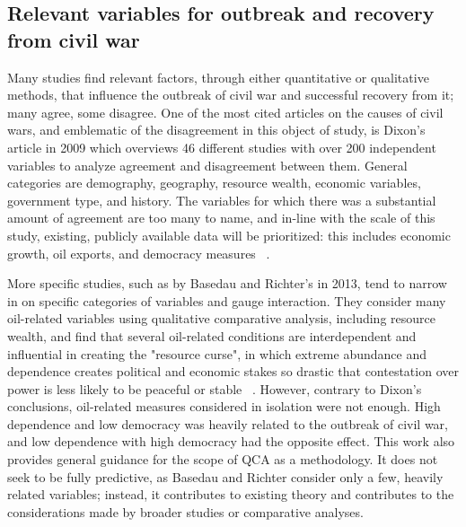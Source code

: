 \documentclass{article}
\begin{document}
\subsection{Relevant variables for outbreak and recovery from civil war}
Many studies find relevant factors, through either quantitative or qualitative methods, that influence the outbreak of civil war and successful recovery from it; many agree, some disagree. One of the most cited articles on the causes of civil wars, and emblematic of the disagreement in this object of study, is Dixon's article in 2009 which overviews 46 different studies with over 200 independent variables to analyze agreement and disagreement between them. General categories are demography, geography, resource wealth, economic variables, government type, and history. The variables for which there was a substantial amount of agreement are too many to name, and in-line with the scale of this study, existing, publicly available data will be prioritized: this includes economic growth, oil exports, and democracy measures ~\cite{dixon}.

More specific studies, such as by Basedau and Richter's in 2013, tend to narrow in on specific categories of variables and gauge interaction. They consider many oil-related variables using qualitative comparative analysis, including resource wealth, and find that several oil-related conditions are interdependent and influential in creating the "resource curse", in which extreme abundance and dependence creates political and economic stakes so drastic that contestation over power is less likely to be peaceful or stable ~\cite{basedau}. However, contrary to Dixon's conclusions, oil-related measures considered in isolation were not enough. High dependence and low democracy was heavily related to the outbreak of civil war, and low dependence with high democracy had the opposite effect. This work also provides general guidance for the scope of QCA as a methodology. It does not seek to be fully predictive, as Basedau and Richter consider only a few, heavily related variables; instead, it contributes to existing theory and contributes to the considerations made by broader studies or comparative analyses. 
\end{document}
